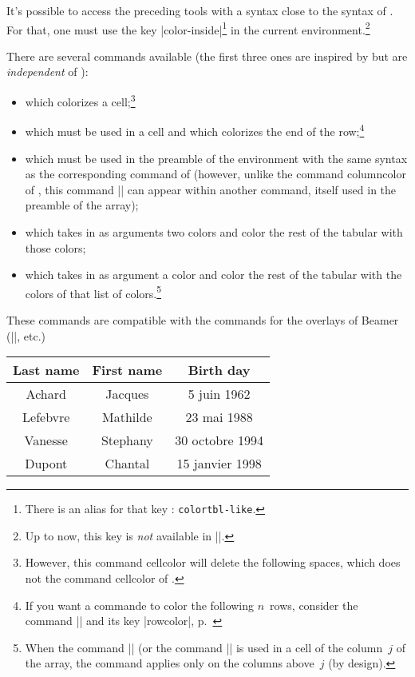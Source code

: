 \documentclass[dvipsnames]{article}%
\begin{document}
It's possible to access the preceding tools with a syntax close to the syntax
of . For that, one must use the key |color-inside|\footnote{There
  is an alias for that key : \texttt{colortbl-like}.} in the
current environment.\footnote{Up to now, this key is \emph{not} available in |\NiceMatrixOptions|.}

There are several commands available (the first three ones are inspired by
 but are \emph{independent} of ):
\begin{itemize}
\item {} which colorizes a cell;\footnote{However,
  this command cellcolor will delete the following spaces, which does not the
  command cellcolor of .}
\item {} which must be used in a cell and which
colorizes the end of the row;\footnote{If you want a commande to color the
  following $n$~rows, consider the command |\RowStyle| and its key |rowcolor|,
  p.~\pageref{RowStyle}} 
\item {} which must be used in the preamble of the
environment with the same syntax as the corresponding command of 
(however, unlike the command columncolor of , this command
|\columncolor| can appear within another command, itself used in the preamble of
the array);
\item {} which takes in as arguments two colors and
color the rest of the tabular with those colors;
\item {} which takes in as argument a color and
color the rest of the tabular with the colors of that list of
colors.\footnote{When the command |\rowlistcolors| (or the command |\rowcolors|
  is used in a cell of the column~$j$ of the array, the command applies only on
  the columns above~$j$ (by design).}
\end{itemize}
These commands are compatible with the commands for the overlays of Beamer
(|\only|, etc.) 

\smallskip
\begin{Code}
\NewDocumentCommand { \Blue } { } { \emph{} }
\begin{NiceTabular}{>{\Blue}c>{\Blue}cc} 
\toprule
\emph{}
Last name & First name & Birth day \\
\midrule
Achard  & Jacques & 5 juin 1962 \\
Lefebvre & Mathilde & 23 mai 1988 \\
Vanesse & Stephany & 30 octobre 1994 \\
Dupont & Chantal & 15 janvier 1998 \\
\bottomrule
\end{NiceTabular}
\end{Code}
\end{document}
